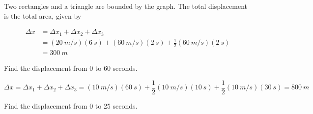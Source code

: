 \documentclass[]{exam}
\begin{document}
\begin{questions}
\begin{solution}
Two rectangles and a triangle are bounded by the graph. The total displacement is the total area, given by

\begin{align*}
    \Delta x &= \Delta x_1 + \Delta x_2 + \Delta x_3 \\[1ex]
    &= (\SI{20}{m/s})(\SI{6}{s}) + (\SI{60}{m/s})(\SI{2}{s}) + \frac{1}{2} (\SI{60}{m/s})(\SI{2}{s}) \\[1ex]
    &= \boxed{\SI{300}{m}}
\end{align*}
\end{solution}

\question
Find the displacement from 0 to 60 seconds.

\begin{center}
\end{center}

\begin{solution}

\begin{equation*}
    \Delta x = \Delta x_1 + \Delta x_2 + \Delta x_3 = (\SI{10}{m/s})(\SI{60}{s}) + \frac{1}{2} (\SI{10}{m/s})(\SI{10}{s}) + \frac{1}{2}(\SI{10}{m/s})(\SI{30}{s}) = \boxed{\SI{800}{m}}
\end{equation*}
\end{solution}

\question
Find the displacement from 0 to 25 seconds.


\end{questions}
\end{document}
